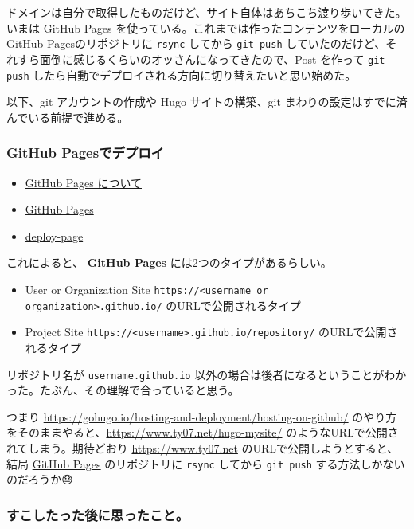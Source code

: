 \documentclass[11pt]{article}
\begin{document}
ドメインは自分で取得したものだけど、サイト自体はあちこち渡り歩いてきた。いまは GitHub Pages を使っている。これまでは作ったコンテンツをローカルの\href{https://github.com/ac1965/ac1965.github.io}{GitHub Pages}のリポジトリに \texttt{rsync} してから \texttt{git push} していたのだけど、それすら面倒に感じるくらいのオッさんになってきたので、Post を作って \texttt{git push} したら自動でデプロイされる方向に切り替えたいと思い始めた。

以下、git アカウントの作成や Hugo サイトの構築、git まわりの設定はすでに済んでいる前提で進める。
\subsubsection{GitHub Pagesでデプロイ}
\label{sec:orgc1d3998}
\begin{itemize}
\item \href{https://docs.github.com/ja/pages/getting-started-with-github-pages/about-github-pages}{GitHub Pages について}
\item \href{https://pages.github.com}{GitHub Pages}
\item \href{https://github.com/actions/deploy-pages}{deploy-page}
\end{itemize}

これによると、 \textbf{GitHub Pages} には2つのタイプがあるらしい。

\begin{itemize}
\item User or Organization Site
\texttt{https://<username or organization>.github.io/} のURLで公開されるタイプ
\item Project Site
\texttt{https://<username>.github.io/repository/} のURLで公開されるタイプ
\end{itemize}

リポジトリ名が \texttt{username.github.io} 以外の場合は後者になるということがわかった。たぶん、その理解で合っていると思う。

つまり \url{https://gohugo.io/hosting-and-deployment/hosting-on-github/} のやり方をそのままやると、\url{https://www.ty07.net/hugo-mysite/} のようなURLで公開されてしまう。期待どおり \url{https://www.ty07.net} のURLで公開しようとすると、結局 \href{https://github.com/ac1965/ac1965.github.io}{GitHub Pages} のリポジトリに \texttt{rsync} してから \texttt{git push} する方法しかないのだろうか😓
\subsubsection{すこしたった後に思ったこと。}
\label{sec:orgc3dadf9}
\end{document}
